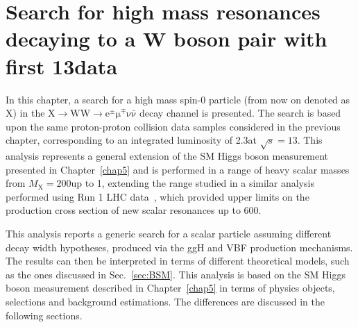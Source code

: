 \chapter[Search for high mass resonances decaying to a W boson pair with first \boldmath$13\TeV$ data]{Search for high mass resonances decaying to a W boson pair with first 13\TeV data}\label{chap6}
\thispagestyle{empty}

In this chapter, a search for a high mass spin-0 particle (from now on denoted as X) in the $\mathrm{X\to WW \to e^{\pm}\mu^{\mp}\nu\bar{\nu}}$ decay channel is presented. 
The search is based upon the same proton-proton collision data samples considered in the previous chapter, corresponding to an integrated luminosity of 2.3\ifb  at $\sqrt{s} = 13$\TeV. This analysis represents a general extension of the SM Higgs boson measurement presented in Chapter~\ref{chap5} and is performed in a range of heavy scalar masses from $M_\mathrm{X} = 200$\GeV up to 1\TeV, extending the range studied in a similar analysis performed using Run 1 LHC data~\cite{Khachatryan:2015cwa}, which provided upper limits on the production cross section of new scalar resonances up to 600\GeV.


This analysis reports a generic search for a scalar particle assuming different decay width hypotheses, produced via the ggH and VBF production mechanisms. The results can then be interpreted in terms of different theoretical models, such as the ones discussed in Sec.~\ref{sec:BSM}. This analysis is based on the SM Higgs boson measurement described in Chapter~\ref{chap5} in terms of physics objects, selections and background estimations. The differences are discussed in the following sections.

%






